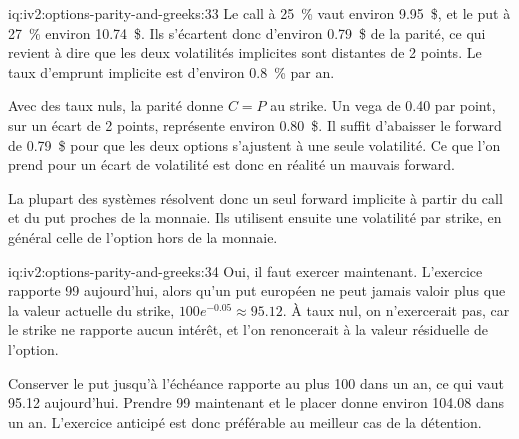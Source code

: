 \begin{solution}{iq:iv2:options-parity-and-greeks:33}
Le call à 25~\% vaut environ 9.95~\$, et le put à 27~\% environ 10.74~\$. Ils s'écartent donc d'environ 0.79~\$ de la parité, ce qui revient à dire que les deux volatilités implicites sont distantes de 2 points. Le taux d'emprunt implicite est d'environ 0.8~\% par an.

Avec des taux nuls, la parité donne $C = P$ au strike. Un vega de 0.40 par point, sur un écart de 2 points, représente environ 0.80~\$. Il suffit d'abaisser le forward de 0.79~\$ pour que les deux options s'ajustent à une seule volatilité. Ce que l'on prend pour un écart de volatilité est donc en réalité un mauvais forward.

La plupart des systèmes résolvent donc un seul forward implicite à partir du call et du put proches de la monnaie. Ils utilisent ensuite une volatilité par strike, en général celle de l'option hors de la monnaie.

\end{solution}

\begin{solution}{iq:iv2:options-parity-and-greeks:34}
Oui, il faut exercer maintenant. L'exercice rapporte 99 aujourd'hui, alors qu'un put européen ne peut jamais valoir plus que la valeur actuelle du strike, $100e^{-0.05} \approx 95.12$. À taux nul, on n'exercerait pas, car le strike ne rapporte aucun intérêt, et l'on renoncerait à la valeur résiduelle de l'option.

Conserver le put jusqu'à l'échéance rapporte au plus 100 dans un an, ce qui vaut 95.12 aujourd'hui. Prendre 99 maintenant et le placer donne environ 104.08 dans un an. L'exercice anticipé est donc préférable au meilleur cas de la détention.

\end{solution}

